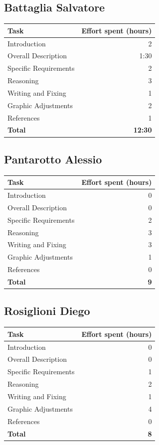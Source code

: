 \documentclass{article}
\begin{document}
\subsection{Battaglia Salvatore}
\begin{center}
    \begin{tabular}{|l|r|}
\hline
\textbf{Task} & \textbf{Effort spent (hours)} \\
\hline
Introduction &  2 \\
Overall Description &  1:30\\
Specific Requirements &  2\\
Reasoning &  3\\
Writing and Fixing &  1\\
Graphic Adjustments &  2\\
References & 1\\
\hline
\textbf{Total} & \textbf{12:30} \\
\hline
\end{tabular}
\end{center}

\subsection{Pantarotto Alessio}
\begin{center}
    \begin{tabular}{|l|r|}
\hline
\textbf{Task} & \textbf{Effort spent (hours)} \\
\hline
Introduction &  0\\
Overall Description &  0\\
Specific Requirements &  2\\
Reasoning &  3 \\
Writing and Fixing &  3\\
Graphic Adjustments &  1\\
References & 0\\
\hline
\textbf{Total} & \textbf{9} \\
\hline
\end{tabular}
\end{center}

\subsection{Rosiglioni Diego}
\begin{center}
    \begin{tabular}{|l|r|}
\hline
\textbf{Task} & \textbf{Effort spent (hours)} \\
\hline
Introduction &  0\\
Overall Description &  0\\
Specific Requirements &  1\\
Reasoning &  2\\
Writing and Fixing &  1\\
Graphic Adjustments &  4\\
References & 0\\
\hline
\textbf{Total} & \textbf{8} \\
\hline
\end{tabular}
\end{center}
\end{document}
